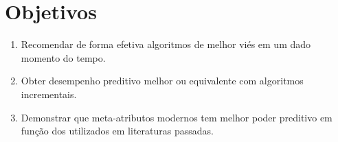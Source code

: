 \section{Objetivos}

\begin{enumerate}
    \item Recomendar de forma efetiva algoritmos de melhor viés em um dado momento
        do tempo.
    \item Obter desempenho preditivo melhor ou equivalente com algoritmos incrementais.
    \item Demonstrar que meta-atributos modernos tem melhor poder preditivo em função
        dos utilizados em literaturas passadas.
\end{enumerate}
